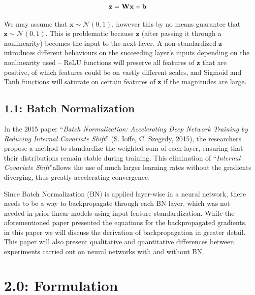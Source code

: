 \documentclass{article}
\begin{document}
\begin{multicols}{2}
\begin{equation}
    \textbf{z} = \textbf{Wx} + \textbf{b} \notag
\end{equation}

We may assume that $\textbf{x} \sim \mathcal{N}(0, 1)$, however this by no means
guarantee that $\textbf{z} \sim \mathcal{N}(0, 1)$. This is problematic because 
$\textbf{z}$ (after passing it through a nonlinearity) becomes the input to
the next layer. A non-standardized $\textbf{z}$ introduces different
behaviours on the succeeding layer's inputs depending on the nonlinearity 
used -- ReLU functions will preserve all features of $\textbf{z}$ that are positive,
of which features could be on vastly different scales,
and Sigmoid and Tanh functions will saturate on certain features of $\textbf{z}$
if the magnitudes are large.










\subsection*{1.1: Batch Normalization}
In the 2015 paper ``\textit{Batch Normalization: Accelerating Deep Network Training 
by Reducing Internal Covariate Shift}'' (S. Ioffe, C. Szegedy, 2015), the researchers
propose a method to standardize the weighted sum of each layer, ensuring that their
distributions remain stable during training. This elimination of ``\textit{Internal Covariate Shift}''allows the use of much larger learning
rates without the gradients diverging, thus greatly accelerating convergence.

Since Batch Normalization (BN) is applied layer-wise in a neural network, 
there needs to be a way to backpropagate through each BN layer, which 
was not needed in prior linear models using input feature standardization.
While the aforementioned paper presented the equations for the backpropagated
gradients, in this paper we will discuss the derivation of backpropagation
in greater detail. This paper will also present qualitative and quantitative
differences between experiments carried out on neural networks with 
and without BN.








\section*{2.0: Formulation}


\end{multicols}
\end{document}
